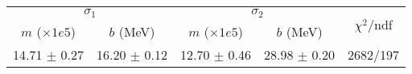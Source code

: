 \begin{tabular}{cc|cc||c}
\multicolumn{2}{c|}{$\sigma_1$} & \multicolumn{2}{|c}{$\sigma_2$}  & \multirow{2}{*}{$\chi^2/$ndf}\\
$m$ ($\times1e5$) & $b$ (MeV) & $m$ ($\times1e5$) & $b$ (MeV)  & \\
\hline
14.71 $\pm$ 0.27 & 16.20 $\pm$ 0.12 & 12.70 $\pm$ 0.46 & 28.98 $\pm$ 0.20 & 2682/197\\
\end{tabular}
